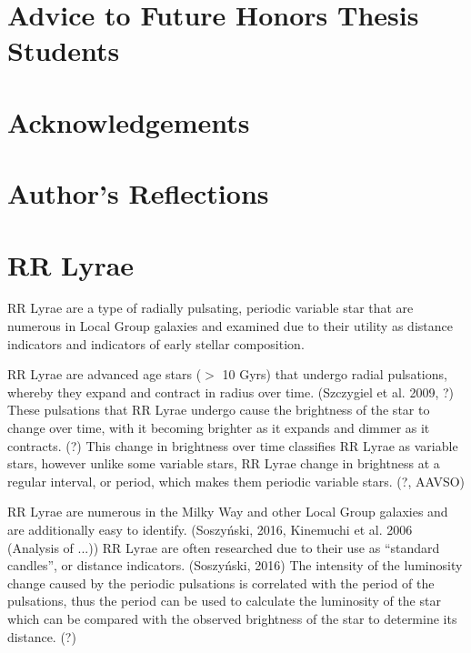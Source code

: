\documentclass[]{article}
\begin{document}
\newpage

\doublespacing

\tableofcontents

\newpage


\section{Advice to Future Honors Thesis Students}

\newpage

\section{Acknowledgements}

\newpage

\section{Author's Reflections}

\newpage

\section{RR Lyrae}

RR Lyrae are a type of radially pulsating, periodic variable star that are numerous in Local Group galaxies and examined due to their utility as distance indicators and indicators of early stellar composition. \cite{szczygiel_2009, kinemuchi_2006_a}

RR Lyrae are advanced age stars ($>$ 10 Gyrs) that undergo radial pulsations, whereby they expand and contract in radius over time. \cite{szczygiel_2009} (Szczygiel et al. 2009, ?) These pulsations that RR Lyrae undergo cause the brightness of the star to change over time, with it becoming brighter as it expands and dimmer as it contracts. (?) This change in brightness over time classifies RR Lyrae as variable stars, however unlike some variable stars, RR Lyrae change in brightness at a regular interval, or period, which makes them periodic variable stars. (?, AAVSO)

RR Lyrae are numerous in the Milky Way and other Local Group galaxies and are additionally easy to identify. (Soszyński, 2016, Kinemuchi et al. 2006 (Analysis of ...)) RR Lyrae are often researched due to their use as “standard candles”, or distance indicators. (Soszyński, 2016) The intensity of the luminosity change caused by the periodic pulsations is correlated with the period of the pulsations, thus the period can be used to calculate the luminosity of the star which can be compared with the observed brightness of the star to determine its distance. (?)
\end{document}
